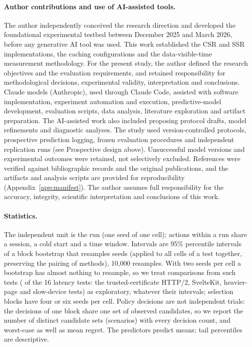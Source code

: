 \documentclass[acmsmall,review,nonacm]{acmart}
\begin{document}
\paragraph{Author contributions and use of AI-assisted tools.}
The author independently conceived the research direction and developed the foundational experimental testbed between December 2025 and March 2026, before any generative AI tool was used. This work established the CSR and SSR implementations, the caching configurations and the data-visible-time measurement methodology. For the present study, the author defined the research objectives and the evaluation requirements, and retained responsibility for methodological decisions, experimental validity, interpretation and conclusions.
Claude models (Anthropic), used through Claude Code, assisted with software implementation, experiment automation and execution, predictive-model development, evaluation scripts, data analysis, literature exploration and artifact preparation. The AI-assisted work also included proposing protocol drafts, model refinements and diagnostic analyses.
The study used version-controlled protocols, prospective prediction logging, frozen evaluation procedures and independent replication runs (see Prospective design above). Unsuccessful model versions and experimental outcomes were retained, not selectively excluded. References were verified against bibliographic records and the original publications, and the artifacts and analysis scripts are provided for reproducibility (Appendix~\ref{app:manifest}). The author assumes full responsibility for the accuracy, integrity, scientific interpretation and conclusions of this work.

\paragraph{Statistics.}
The independent unit is the run (one seed of one cell); actions within a run share a session, a cold start and a time window. Intervals are 95\% percentile intervals of a block bootstrap that resamples seeds (applied to all cells of a test together, preserving the pairing of methods), 10{,}000 resamples. With two seeds per cell a bootstrap has almost nothing to resample, so we treat comparisons from such tests (\AfourTwoSeed{} of the 16 latency tests: the trusted-certificate HTTP/2, SvelteKit, heavier-page and slow-device tests) as exploratory, whatever their intervals; selection blocks have four or six seeds per cell. Policy decisions are not independent trials: the decisions of one block share one set of observed candidates, so we report the number of distinct candidate sets (scenarios) with every decision count, and worst-case as well as mean regret. The predictors predict means; tail percentiles are descriptive.
\end{document}
